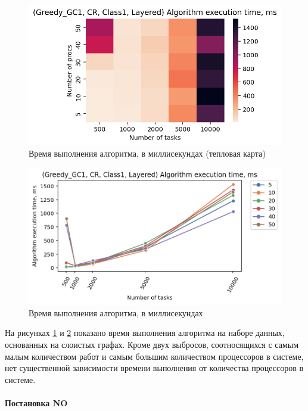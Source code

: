 \begin{figure}[!htbp]
    \centering
    \includegraphics[width=\textwidth]{imgs/layered_class_1/CR/et_heatmap.png}
    \caption{Время выполнения алгоритма, в миллисекундах (тепловая карта)}
    \label{fig:CR-layered-exec-time-heatmap}
\end{figure}

\begin{figure}[!htbp]
    \centering
    \includegraphics[width=\textwidth]{imgs/layered_class_1/CR/tr_graph.png}
    \caption{Время выполнения алгоритма, в миллисекундах}
    \label{fig:CR-layered-exec-time-compiled}
\end{figure}

На рисунках \ref{fig:CR-layered-exec-time-heatmap} и \ref{fig:CR-layered-exec-time-compiled} показано время выполнения алгоритма на наборе данных, основанных на слоистых графах. Кроме двух выбросов, соотносящихся с самым малым количеством работ и самым большим количеством процессоров в системе, нет существенной зависимости времени выполнения от количества процессоров в системе.

\paragraph{Постановка NO}

